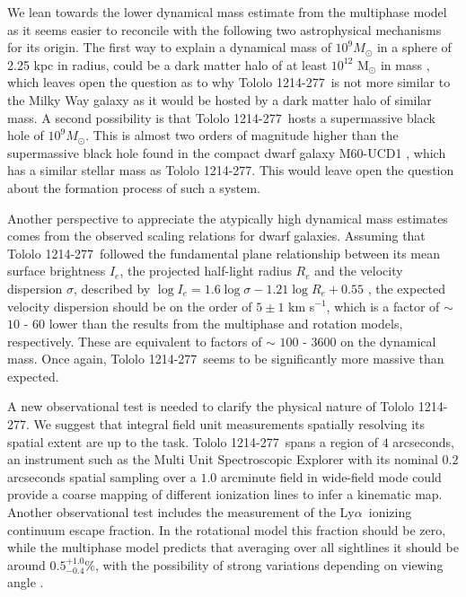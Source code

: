\documentclass[a4paper, usenatbib, 12pt]{article}
\newcommand{\tol}{Tololo 1214-277}
\newcommand{\lya}{Ly$\alpha$}
\newcommand{\kms}{km s$^{-1}$}
\begin{document}
{We lean towards the lower dynamical mass estimate from the multiphase
model as it seems easier to reconcile with the following two
astrophysical mechanisms for its origin.
The first way to explain a dynamical mass of $10^{9} M_{\odot}$
in a sphere of 2.25 kpc in radius, could be a dark matter halo of at
least $10^{12}$ M$_{\odot}$ in mass \cite{2011ApJ...726..108T}, which
leaves open the question as to why  \tol\ is not more similar to the
Milky Way galaxy as it would be hosted by a dark matter halo of similar
mass. 
A second possibility is that \tol\ hosts a supermassive black hole of
$10^{9} M_{\odot}$. This is almost two orders of magnitude higher
than the supermassive black hole found in the compact dwarf galaxy
M60-UCD1 \cite{2014Natur.513..398S}, which has a similar stellar mass
as \tol. This would leave open the question about the formation
process of such a system.   
 

Another perspective to appreciate the atypically high dynamical mass
estimates comes from the observed scaling relations for dwarf
galaxies.
Assuming that \tol\ followed the fundamental plane relationship
between its mean surface brightness $I_e$, the projected half-light
radius $R_e$ and the velocity dispersion $\sigma$, described by $\log
I_e=1.6 \log\sigma - 1.21\log R_e + 0.55$ \cite{2009ApJ...698.1590G},
the expected velocity dispersion should be on the order of $5 \pm 1$ 
\kms, which is a factor of $\sim$ $10$ - $60$ lower than the 
results from the multiphase and rotation models, respectively. 
These are equivalent to factors of $\sim$ $100$ - $3600$ on the
dynamical mass.
Once again,  \tol\ seems to be significantly more massive than
expected. 




A new observational test is needed to clarify the physical nature of
\tol. 
We suggest that integral field unit measurements spatially
resolving its spatial extent are up to the task. 
\tol\ spans a region of $4$ arcseconds,
an instrument such as the Multi Unit Spectroscopic Explorer
\cite{2014Msngr.157...13B} with its
nominal $0.2$ arcseconds spatial sampling over a $1.0$ arcminute field
in wide-field mode could provide a coarse mapping of different
ionization lines to infer a kinematic map.
Another observational test includes the measurement of the
\lya\ ionizing continuum escape fraction.
In the rotational model this fraction should be zero, while
the multiphase model predicts that averaging over all sightlines
it should be around $0.5^{+1.0}_{-0.4}$\%, with the possibility of strong
variations depending on viewing angle \cite{2014MNRAS.444.1095G}. 

}
\end{document}
